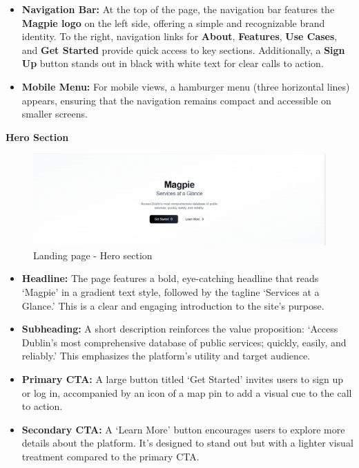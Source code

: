 \begin{itemize}
    \item{} \textbf{Navigation Bar:} At the top of the page, the navigation bar
    features the \textbf{Magpie logo} on the left side, offering a simple and
    recognizable brand identity. To the right, navigation links for
    \textbf{About}, \textbf{Features}, \textbf{Use Cases}, and \textbf{Get
    Started} provide quick access to key sections. Additionally, a \textbf{Sign
    Up} button stands out in black with white text for clear calls to action.
    \item{} \textbf{Mobile Menu:} For mobile views, a hamburger menu (three
    horizontal lines) appears, ensuring that the navigation remains compact and
    accessible on smaller screens.
\end{itemize}

\textbf{Hero Section}

\begin{figure}[htbp]
    \centering{}
    \includegraphics[width=1\textwidth]{images/site/landing/landing_1_hero.png}
    \caption{Landing page {-} Hero section}
\end{figure}

\begin{itemize}
    \item{} \textbf{Headline:} The page features a bold, eye{-}catching headline
    that reads `Magpie' in a gradient text style, followed by the tagline
    `Services at a Glance.' This is a clear and engaging introduction to the
    site's purpose.
    \item{} \textbf{Subheading:} A short description reinforces the value
    proposition: `Access Dublin's most comprehensive database of public
    services; quickly, easily, and reliably.' This emphasizes the platform's
    utility and target audience.
    \item{} \textbf{Primary CTA:} A large button titled `Get Started' invites
    users to sign up or log in, accompanied by an icon of a map pin to add a
    visual cue to the call to action.
    \item{} \textbf{Secondary CTA:} A `Learn More' button encourages users to
    explore more details about the platform. It's designed to stand out but with
    a lighter visual treatment compared to the primary CTA\@.
\end{itemize}


